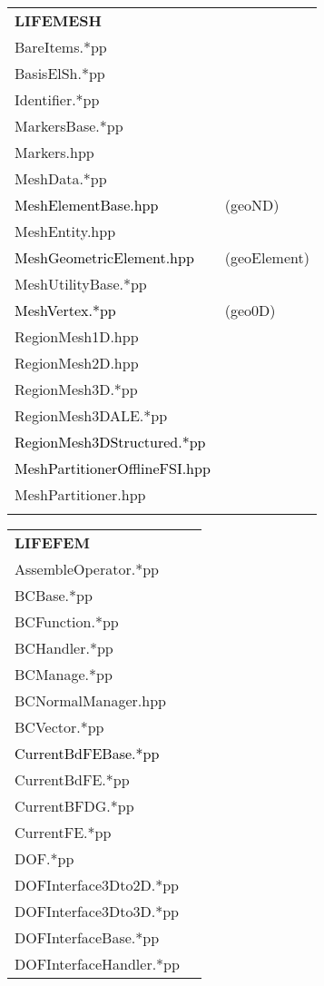 \documentclass[10p]{article}
\newcommand{\newparts}[1]{\textcolor{black}{#1}}
\newcommand{\newpartsVC}[1]{\textcolor{black}{#1}}
\theoremstyle{definition}
\begin{document}
\begin{landscape}
\begin{table}[!h]
\begin{multicols}{4}
\begin{xtabular}{
p{0.18\textwidth}<{}
p{0.1\textwidth}<{}
}
\textbf{LIFEMESH} \\
BareItems.*pp & \\
BasisElSh.*pp & \\
Identifier.*pp & \\
MarkersBase.*pp & \\
Markers.hpp & \\
MeshData.*pp & \\
\newpartsVC{MeshElementBase.hpp} & (geoND)\\
MeshEntity.hpp & \\
\newpartsVC{MeshGeometricElement.hpp} & (geoElement)\\
MeshUtilityBase.*pp & \\
\newpartsVC{MeshVertex.*pp} & (geo0D)\\
RegionMesh1D.hpp & \\
RegionMesh2D.hpp & \\
RegionMesh3D.*pp & \\
RegionMesh3DALE.*pp & \\
\newparts{RegionMesh3DStructured.*pp} & \\
\newparts{MeshPartitionerOfflineFSI.hpp} & \\
MeshPartitioner.hpp & \\
& \\
\end{xtabular}
\begin{xtabular}{
p{0.18\textwidth}<{}
p{0.1\textwidth}<{}
}
\textbf{LIFEFEM} \\
AssembleOperator.*pp & \\
BCBase.*pp & \\
BCFunction.*pp & \\
BCHandler.*pp & \\
BCManage.*pp & \\
BCNormalManager.hpp & \\
BCVector.*pp & \\
\newparts{CurrentBdFEBase.*pp} & \\
CurrentBdFE.*pp & \\
CurrentBFDG.*pp & \\
CurrentFE.*pp & \\
DOF.*pp & \\
DOFInterface3Dto2D.*pp & \\
DOFInterface3Dto3D.*pp & \\
DOFInterfaceBase.*pp & \\
DOFInterfaceHandler.*pp & \\

\end{xtabular}
\end{multicols}
\end{table}
\end{landscape}
\end{document}
